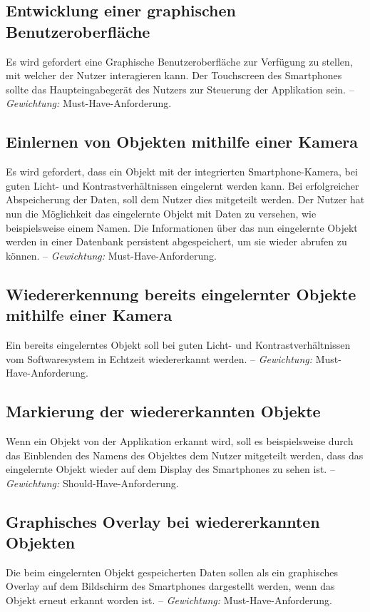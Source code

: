 \documentclass[oneside]{ausarbeitung}
\begin{document}
\subsection{Entwicklung einer graphischen Benutzeroberfläche}
Es wird gefordert eine Graphische Benutzeroberfläche zur Verfügung zu stellen, mit welcher der Nutzer interagieren kann. Der Touchscreen des Smartphones sollte das Haupteingabegerät des Nutzers zur Steuerung der Applikation sein. -- \textit{Gewichtung:} Must-Have-Anforderung.
\subsection{Einlernen von Objekten mithilfe einer Kamera}
Es wird gefordert, dass ein Objekt mit der integrierten Smartphone-Kamera, bei guten Licht- und Kontrastverhältnissen eingelernt werden kann. Bei erfolgreicher Abspeicherung der Daten, soll dem Nutzer dies mitgeteilt werden. Der Nutzer hat nun die Möglichkeit das eingelernte Objekt mit Daten zu versehen, wie beispielsweise einem Namen. Die Informationen über das nun eingelernte Objekt werden in einer Datenbank persistent abgespeichert, um sie wieder abrufen zu können. -- \textit{Gewichtung:} Must-Have-Anforderung.

\subsection{Wiedererkennung bereits eingelernter Objekte mithilfe einer Kamera}
Ein bereits eingelerntes Objekt soll bei guten Licht- und Kontrastverhältnissen vom Softwaresystem in Echtzeit wiedererkannt werden. -- \textit{Gewichtung:} Must-Have-Anforderung.

\subsection{Markierung der wiedererkannten Objekte}
Wenn ein Objekt von der Applikation erkannt wird, soll es beispielsweise durch das Einblenden des Namens des Objektes dem Nutzer mitgeteilt werden, dass das eingelernte Objekt wieder auf dem Display des Smartphones zu sehen ist. -- \textit{Gewichtung:} Should-Have-Anforderung.
\subsection{Graphisches Overlay bei wiedererkannten Objekten}
Die beim eingelernten Objekt gespeicherten Daten sollen als ein graphisches Overlay auf dem Bildschirm des Smartphones dargestellt werden, wenn das Objekt erneut erkannt worden ist. -- \textit{Gewichtung:} Must-Have-Anforderung.
\end{document}
